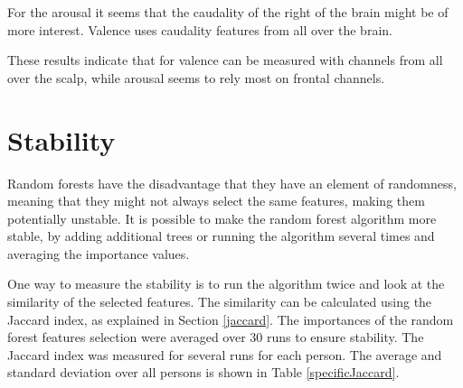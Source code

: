 For the arousal it seems that the caudality of the right of the brain might be of more interest. Valence uses caudality features from all over the brain.

\npar

These results indicate that for valence can be measured with channels from all over the scalp, while arousal seems to rely most on frontal channels.

\section{Stability}
Random forests have the disadvantage that they have an element of randomness, meaning that they might not always select the same features, making them potentially unstable. It is possible to make the random forest algorithm more stable, by adding additional trees or running the algorithm several times and averaging the importance values. 

\npar

One way to measure the stability is to run the algorithm twice and look at the similarity of the selected features. The similarity can be calculated using the Jaccard index, as explained in Section \ref{jaccard}. The importances of the random forest features selection were averaged over 30 runs to ensure stability. The Jaccard index was measured for several runs for each person. The average and standard deviation over all persons is shown in Table \ref{specificJaccard}.

